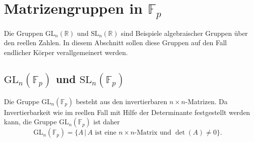 %
%
%
\section{Matrizengruppen in $\mathbb F_p$}
Die Gruppen $\textrm{GL}_n(\mathbb R)$ und $\textrm{SL}_n(\mathbb R)$
sind Beispiele algebraischer Gruppen über den reellen Zahlen.
In diesem Abschnitt sollen diese Gruppen auf den Fall endlicher Körper
verallgemeinert werden.

\subsection{$\textrm{GL}_n(\mathbb F_p)$ und $\textrm{SL}_n(\mathbb F_p)$}
Die Gruppe $\textrm{GL}_n(\mathbb F_p)$ besteht aus den
invertierbaren $n\times n$-Matrizen.
Da Invertierbarkeit wie im reellen Fall mit Hilfe der Determinante
festgestellt werden kann, die Gruppe $\textrm{GL}_n(\mathbb F_p)$ ist 
daher
\[
\textrm{GL}_n(\mathbb F_p)
=
\{ A\,|\,\text{$A$ ist eine $n\times n$-Matrix und $\det(A)\ne 0$}\}.
\]


